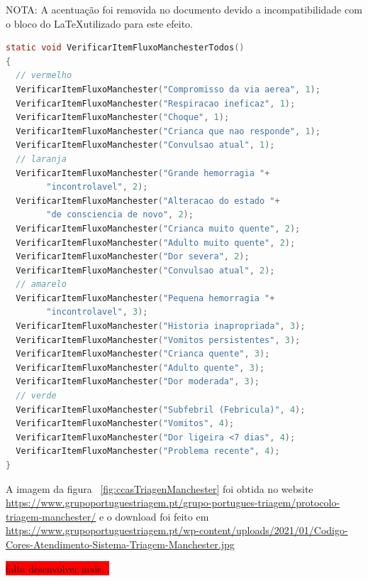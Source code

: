 \noindent NOTA: A acentuação foi removida no documento devido a incompatibilidade com o bloco do \LaTeX utilizado para este efeito.

\begin{lstlisting}[language={c},
	caption={Verificar e/ou Inserir lista de itens do Fluxo de Manchester},
	label=lst:itensFluxoManchester]
static void VerificarItemFluxoManchesterTodos()
{
  // vermelho
  VerificarItemFluxoManchester("Compromisso da via aerea", 1);
  VerificarItemFluxoManchester("Respiracao ineficaz", 1);
  VerificarItemFluxoManchester("Choque", 1);
  VerificarItemFluxoManchester("Crianca que nao responde", 1);
  VerificarItemFluxoManchester("Convulsao atual", 1);
  // laranja
  VerificarItemFluxoManchester("Grande hemorragia "+
  		"incontrolavel", 2);
  VerificarItemFluxoManchester("Alteracao do estado "+
  		"de consciencia de novo", 2);
  VerificarItemFluxoManchester("Crianca muito quente", 2);
  VerificarItemFluxoManchester("Adulto muito quente", 2);
  VerificarItemFluxoManchester("Dor severa", 2);
  VerificarItemFluxoManchester("Convulsao atual", 2);
  // amarelo
  VerificarItemFluxoManchester("Pequena hemorragia "+
  		"incontrolavel", 3);
  VerificarItemFluxoManchester("Historia inapropriada", 3);
  VerificarItemFluxoManchester("Vomitos persistentes", 3);
  VerificarItemFluxoManchester("Crianca quente", 3);
  VerificarItemFluxoManchester("Adulto quente", 3);
  VerificarItemFluxoManchester("Dor moderada", 3);
  // verde
  VerificarItemFluxoManchester("Subfebril (Febricula)", 4);
  VerificarItemFluxoManchester("Vomitos", 4);
  VerificarItemFluxoManchester("Dor ligeira <7 dias", 4);
  VerificarItemFluxoManchester("Problema recente", 4);
}
\end{lstlisting}



A imagem da figura ~\ref{fig:ccasTriagenManchester} foi obtida no website \url{https://www.grupoportuguestriagem.pt/grupo-portugues-triagem/protocolo-triagem-manchester/} e o download foi feito em \url{https://www.grupoportuguestriagem.pt/wp-content/uploads/2021/01/Codigo-Cores-Atendimento-Sistema-Triagem-Manchester.jpg}
 
\colorbox{red}{\Large falta desenvolver mais...}



